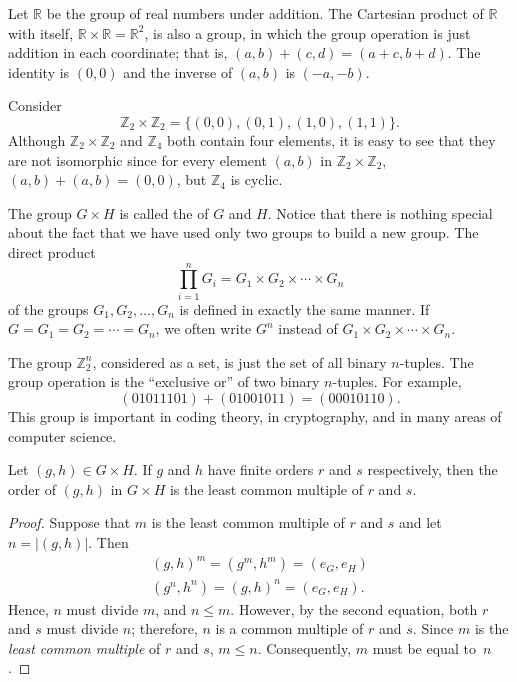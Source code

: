 \begin{example}\label{example:isomorph:R2_prodiuct}
Let ${\mathbb R}$ be the group of real numbers under addition.  The Cartesian product of ${\mathbb R}$ with itself, ${\mathbb R} \times {\mathbb R} = {\mathbb R}^2$, is also a group, in which the group operation is just addition in each coordinate; that is, $(a, b) + (c, d) = (a + c, b + d)$.  The identity is $(0,0)$ and the inverse of $(a, b)$ is $(-a, -b)$.
\end{example}

\begin{example}\label{example:isomorph:Z2xZ2}
Consider
\[
{\mathbb Z}_2 \times {\mathbb Z}_2 = \{ (0, 0), (0, 1), (1, 0),(1, 1) \}.
\]
Although ${\mathbb Z}_2 \times {\mathbb Z}_2$ and ${\mathbb Z}_4$ both contain four elements, it is easy to see that they are not isomorphic since for every element $(a,b)$ in ${\mathbb Z}_2 \times {\mathbb Z}_2$, $(a,b) + (a,b) = (0,0)$, but ${\mathbb Z}_4$ is cyclic.
\end{example}

The group $G \times H$ is called the  of  $G$ and $H$. Notice that there is nothing special about the fact that we have used only two groups to build a new group. The direct product
\[
\prod_{i = 1}^n G_i = G_1 \times G_2 \times \cdots \times G_n
\]
of the groups $G_1, G_2, \ldots, G_n$ is defined in exactly the same manner. If $G = G_1 = G_2 = \cdots = G_n$, we often write $G^n$ instead of $G_1 \times G_2 \times \cdots \times G_n$.
 
\begin{example}\label{example:isomorph:Z2^n}
The group ${\mathbb Z}_2^n$, considered as a set, is just the set of all
binary $n$-tuples. The group operation is the ``exclusive or'' of two
binary $n$-tuples. For example, 
\[
(01011101) + (01001011) = (00010110).
\]
This group is important in coding theory, in cryptography, and in many
areas of computer science.  
\end{example}

 
\begin{thm}\label{isomorph:lcm_theorem}
Let $(g, h) \in G \times H$. If $g$ and $h$ have finite orders $r$ and
$s$ respectively, then the order of $(g, h)$ in $G \times H$ is the
least common multiple of $r$ and $s$. 
\end{thm}

 
\begin{proof}
Suppose that $m$ is the least common multiple of $r$ and $s$ and let
$n = |(g,h)|$. Then 
\begin{gather*}
(g,h)^m  = (g^m, h^m) = (e_G,e_H) \\
(g^n, h^n)  = (g, h)^n = (e_G,e_H).
\end{gather*}
Hence, $n$ must divide $m$, and $n \leq m$.  However, by the second
equation, both $r$ and $s$ must divide $n$; therefore, $n$ is a common
multiple of $r$ and $s$. Since $m$ is the {\em least common multiple\/}
of $r$ and $s$, $m \leq n$.  Consequently, $m$ must be equal to~$n$.
\end{proof}
 

